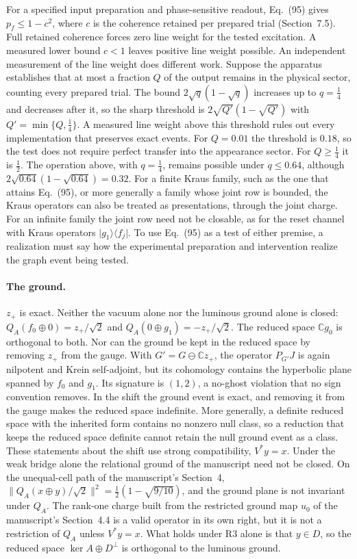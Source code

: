 \documentclass[11pt]{article}
\theoremstyle{remark}
\newcommand{\C}{\mathbb C}
\newcommand{\ket}[1]{\lvert #1\rangle}
\newcommand{\bra}[1]{\langle #1\rvert}
\begin{document}
For a specified input preparation and phase-sensitive readout, Eq.~(95) gives $p_f\le1-c^2$, where $c$ is the coherence retained per prepared trial (Section~7.5). Full retained coherence forces zero line weight for the tested excitation. A measured lower bound $c<1$ leaves positive line weight possible. An independent measurement of the line weight does different work. Suppose the apparatus establishes that at most a fraction $Q$ of the output remains in the physical sector, counting every prepared trial. The bound $2\sqrt q(1-\sqrt q)$ increases up to $q=\tfrac14$ and decreases after it, so the sharp threshold is $2\sqrt{Q'}(1-\sqrt{Q'})$ with $Q'=\min\{Q,\tfrac14\}$. A measured line weight above this threshold rules out every implementation that preserves exact events. For $Q=0.01$ the threshold is $0.18$, so the test does not require perfect transfer into the appearance sector. For $Q\ge\tfrac14$ it is $\tfrac12$. The operation above, with $q=\tfrac14$, remains possible under $q\le0.64$, although $2\sqrt{0.64}(1-\sqrt{0.64})=0.32$. For a finite Kraus family, such as the one that attains Eq.~(95), or more generally a family whose joint row is bounded, the Kraus operators can also be treated as presentations, through the joint charge. For an infinite family the joint row need not be closable, as for the reset channel with Kraus operators $\ket{g_1}\!\bra{f_j}$. To use Eq.~(95) as a test of either premise, a realization must say how the experimental preparation and intervention realize the graph event being tested.

\paragraph{The ground.} $z_+$ is exact. Neither the vacuum alone nor the luminous ground alone is closed: $Q_A(f_0\oplus0)=z_+/\sqrt2$ and $Q_A(0\oplus g_1)=-z_+/\sqrt2$. The reduced space $\C g_0$ is orthogonal to both. Nor can the ground be kept in the reduced space by removing $z_+$ from the gauge. With $G'=G\ominus\C z_+$, the operator $P_{G'}J$ is again nilpotent and Krein self-adjoint, but its cohomology contains the hyperbolic plane spanned by $f_0$ and $g_1$. Its signature is $(1,2)$, a no-ghost violation that no sign convention removes. In the shift the ground event is exact, and removing it from the gauge makes the reduced space indefinite. More generally, a definite reduced space with the inherited form contains no nonzero null class, so a reduction that keeps the reduced space definite cannot retain the null ground event as a class. These statements about the shift use strong compatibility, $V^*y=x$. Under the weak bridge alone the relational ground of the manuscript need not be closed. On the unequal-cell path of the manuscript's Section~4, $\|Q_A(x\oplus y)/\sqrt2\|^2=\tfrac12(1-\sqrt{9/10})$, and the ground plane is not invariant under $Q_A$. The rank-one charge built from the restricted ground map $u_0$ of the manuscript's Section~4.4 is a valid operator in its own right, but it is not a restriction of $Q_A$ unless $V^*y=x$. What holds under R3 alone is that $y\in D$, so the reduced space $\ker A\oplus D^\perp$ is orthogonal to the luminous ground.
\end{document}
